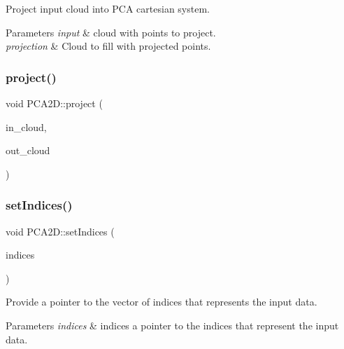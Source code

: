 Project input cloud into P\+CA cartesian system. 


\begin{DoxyParams}{Parameters}
{\em input} & cloud with points to project. \\
\hline
{\em projection} & Cloud to fill with projected points. \\
\hline
\end{DoxyParams}
\mbox{\label{classPCA2D_ac36f8aacab8d6fe1d804f17cfa7b0f78}} 
\subsubsection{\texorpdfstring{project()}{project()}\hspace{0.1cm}{\footnotesize\ttfamily [4/4]}}
{\footnotesize\ttfamily void P\+C\+A2\+D\+::project (\begin{DoxyParamCaption}\item[{const \hyperlink{Normal2dEstimation_8h_a389a43addc496dc19a5bb0575cc60bc4}{Const\+Ptr\+Cloud} \&}]{in\+\_\+cloud,  }\item[{\hyperlink{Normal2dEstimation_8h_a2894055ff89c63cbae90e22dfddaa610}{Ptr\+Cloud} \&}]{out\+\_\+cloud }\end{DoxyParamCaption})\hspace{0.3cm}{\ttfamily [inline]}}

\mbox{\label{classPCA2D_af6c41fea17b2a9debbef5c88dc963f1e}} 
\subsubsection{\texorpdfstring{set\+Indices()}{setIndices()}\hspace{0.1cm}{\footnotesize\ttfamily [1/10]}}
{\footnotesize\ttfamily void P\+C\+A2\+D\+::set\+Indices (\begin{DoxyParamCaption}\item[{const pcl\+::\+Point\+Indices \&}]{indices }\end{DoxyParamCaption})}



Provide a pointer to the vector of indices that represents the input data. 


\begin{DoxyParams}{Parameters}
{\em indices} & indices a pointer to the indices that represent the input data. \\
\hline
\end{DoxyParams}


